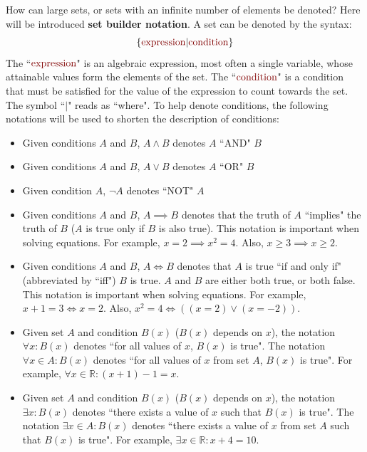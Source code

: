 \documentclass{article}
\newcommand{\dr}[1]{\textcolor{dark_red}{#1}}
\begin{document}
How can large sets, or sets with an infinite number of elements be denoted? Here will be introduced {\bf set builder notation}. A set can be denoted by the syntax:
\[\{\dr{\text{expression}}|\dr{\text{condition}}\}\]
The ``\(\dr{\text{expression}}\)" is an algebraic expression, most often a single variable, whose attainable values form the elements of the set. The ``\(\dr{\text{condition}}\)" is a condition that must be satisfied for the value of the expression to count towards the set. The symbol ``\(|\)" reads as ``where".
To help denote conditions, the following notations will be used to shorten the description of conditions:

\begin{itemize}
\item Given conditions \(A\) and \(B\), \(A \wedge B\) denotes \(A\) ``AND" \(B\)
\item Given conditions \(A\) and \(B\), \(A \vee B\) denotes \(A\) ``OR" \(B\)
\item Given condition \(A\), \(\neg A\) denotes ``NOT" \(A\)
\item Given conditions \(A\) and \(B\), \(A \implies B\) denotes that the truth of \(A\) ``implies" the truth of \(B\) (\(A\) is true only if \(B\) is also true). This notation is important when solving equations. For example, \(x = 2 \implies x^2 = 4\). Also, \(x \geq 3 \implies x \geq 2\).
\item Given conditions \(A\) and \(B\), \(A \iff B\) denotes that \(A\) is true ``if and only if" (abbreviated by ``iff") \(B\) is true. \(A\) and \(B\) are either both true, or both false. This notation is important when solving equations. For example, \(x + 1 = 3 \iff x = 2\). Also, \(x^2 = 4 \iff ((x = 2) \vee (x = -2))\).
\item Given set \(A\) and condition \(B(x)\) (\(B(x)\) depends on \(x\)), the notation \(\forall x : B(x)\) denotes ``for all values of \(x\), \(B(x)\) is true". The notation \(\forall x \in A : B(x)\) denotes ``for all values of \(x\) from set \(A\), \(B(x)\) is true". For example, \(\forall x \in \mathbb{R} : (x + 1) - 1 = x\).
\item Given set \(A\) and condition \(B(x)\) (\(B(x)\) depends on \(x\)), the notation \(\exists x : B(x)\) denotes ``there exists a value of \(x\) such that \(B(x)\) is true". The notation \(\exists x \in A : B(x)\) denotes ``there exists a value of \(x\) from set \(A\) such that \(B(x)\) is true". For example, \(\exists x \in \mathbb{R} : x + 4 = 10\).
\end{itemize}
\end{document}
